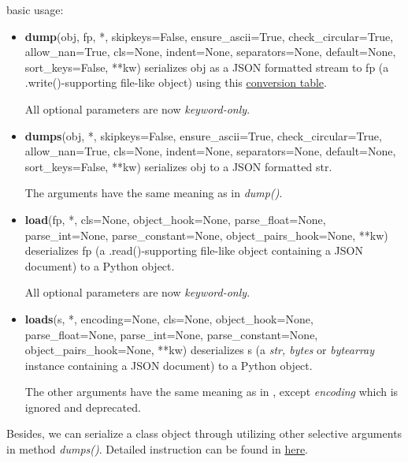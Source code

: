 basic usage:
\begin{itemize}
\item \textbf{dump}(obj, fp, *, skipkeys=False, ensure\_ascii=True, check\_circular=True, allow\_nan=True, cls=None, indent=None, separators=None, default=None, sort\_keys=False, **kw) serializes obj as a JSON formatted stream to fp (a .write()-supporting file-like object) using this \href{https://docs.python.org/3.6/library/json.html#py-to-json-table}{conversion table}.

All optional parameters are now \textit{keyword-only}.
\item \textbf{dumps}(obj, *, skipkeys=False, ensure\_ascii=True, check\_circular=True, allow\_nan=True, cls=None, indent=None, separators=None, default=None, sort\_keys=False, **kw) serializes obj to a JSON formatted str.

The arguments have the same meaning as in \textit{dump()}.
\item \textbf{load}(fp, *, cls=None, object\_hook=None, parse\_float=None, parse\_int=None, parse\_constant=None, object\_pairs\_hook=None, **kw) deserializes fp (a .read()-supporting file-like object containing a JSON document) to a Python object.

All optional parameters are now \textit{keyword-only}.
\item \textbf{loads}(s, *, encoding=None, cls=None, object\_hook=None, parse\_float=None, parse\_int=None, parse\_constant=None, object\_pairs\_hook=None, **kw) deserializes s (a \textit{str, bytes} or \textit{bytearray} instance containing a JSON document) to a Python object.

The other arguments have the same meaning as in , except \textit{encoding} which is ignored and deprecated.
\end{itemize}
Besides, we can serialize a class object through utilizing other selective arguments in method \textit{dumps()}. Detailed instruction can be found in \href{https://docs.python.org/3/library/json.html#json.dumps}{here}.